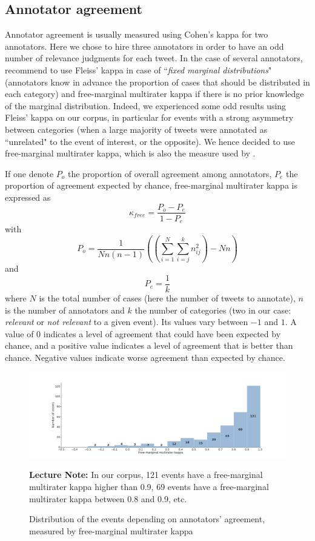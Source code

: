 	\subsection{Annotator agreement}

Annotator agreement is usually measured using Cohen's kappa for two annotators. Here we chose to hire three annotators in order to have an odd number of relevance judgments for each tweet. In the case of several annotators, \citet{randolph_free_2005} recommend to use Fleiss' kappa \citep{fleiss_measuring_1971} in case of ``\textit{fixed marginal distributions}" (annotators know in advance the proportion of cases that should be distributed in each category) and free-marginal multirater kappa \citep{randolph_free_2005} if there is no prior knowledge of the marginal distribution. Indeed, we experienced some odd results using Fleiss' kappa on our corpus, in particular for events with a strong asymmetry between categories (when a large majority of tweets were annotated as ``unrelated" to the event of interest, or the opposite). We hence decided to use free-marginal multirater kappa, which is also the measure used by \citet{mcminn_building_2013}.


If one denote $P_o$ the proportion of overall agreement among annotators, $P_e$ the proportion of agreement expected by chance, free-marginal multirater kappa is expressed as 
$$
\kappa_{free} = \frac{P_o - P_e}{1 - P_e}
$$
with 
$$
P_o = \frac{1}{Nn(n-1)}((\sum_{i=1}^N\sum_{i=j}^kn_{ij}^2)-Nn)
$$
and
$$
P_e = \frac{1}{k}
$$
where $N$ is the total number of cases (here the number of tweets to annotate), $n$ is the number of annotators and $k$ the number of categories (two in our case: \textit{relevant} or \textit{not relevant} to a given event). Its values vary between $-1$ and $1$. A value of $0$ indicates a level of agreement that could have been expected by chance, and a positive value indicates a level of agreement that is better than chance. Negative values indicate worse agreement than expected by chance.


\begin{figure}
\begin{center}
\includegraphics[width=1\textwidth]{figures/HistogramEventsDistributionByKappa.pdf}
\end{center}
{\scriptsize \textbf{Lecture Note:} In our corpus, 121 events have a free-marginal multirater kappa higher than 0.9, 69 events have a free-marginal multirater kappa between 0.8 and 0.9, etc.
}
\caption{Distribution of the events depending on annotators' agreement, measured by free-marginal multirater kappa}
\label{Figure:HistogramEventsByKappa}
\end{figure}

